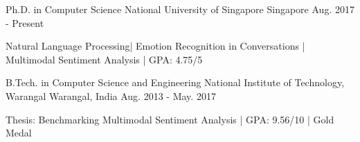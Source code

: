 

\begin{cventries}

  \cventryleft
    {Ph.D. in Computer Science}
    {National University of Singapore}
    {Singapore}
    {Aug. 2017 - Present}
    {
      \begin{cvitems}
        \item {Natural Language Processing| Emotion Recognition in Conversations | Multimodal Sentiment Analysis | GPA: 4.75/5 }
      \end{cvitems}
    }

  \cventryleft
    {B.Tech. in Computer Science and Engineering}
    {National Institute of Technology, Warangal}
    {Warangal, India}
    {Aug. 2013 - May. 2017}
    {
      \begin{cvitems}
        \item {Thesis: Benchmarking Multimodal Sentiment Analysis  |  GPA: 9.56/10  |  Gold Medal}
      \end{cvitems}
    }

\end{cventries}
